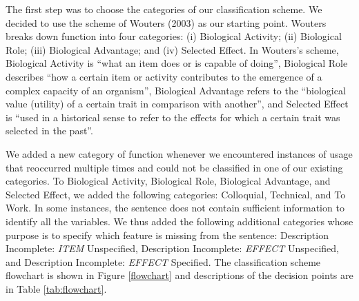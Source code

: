 \documentclass{article}
\begin{document}
The first step was to choose the categories of our classification scheme.
We decided to use the scheme of Wouters (2003) as our starting point.
Wouters breaks down function into four categories: (i) Biological Activity; (ii) Biological Role; (iii) Biological Advantage; and (iv) Selected Effect.
In Wouters's scheme, Biological Activity is ``what an item does or is capable of doing'', Biological Role describes ``how a certain item or activity contributes to the emergence of a complex capacity of an organism'', Biological Advantage refers to the ``biological value (utility) of a certain trait in comparison with another'', and Selected Effect is ``used in a historical sense to refer to the effects for which a certain trait was selected in the past''.

We added a new category of function whenever we encountered instances of usage that reoccurred multiple times and could not be classified in one of our existing categories.
To Biological Activity, Biological Role, Biological Advantage, and Selected Effect, we added the following categories: Colloquial, Technical, and To Work.
In some instances, the sentence does not contain sufficient information to identify all the variables.
We thus added the following additional categories whose purpose is to specify which feature is missing from the sentence: Description Incomplete: \emph{ITEM} Unspecified, Description Incomplete: \emph{EFFECT} Unspecified, and Description Incomplete: \emph{EFFECT} Specified.
The classification scheme flowchart is shown in Figure \ref{flowchart} and descriptions of the decision points are in Table \ref{tab:flowchart}.
\end{document}
